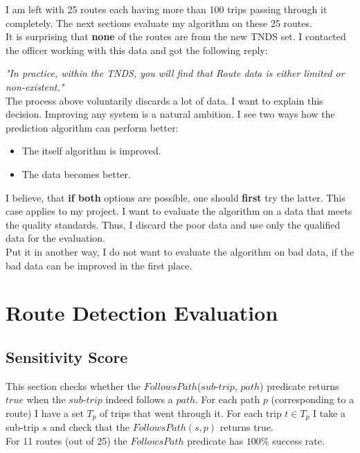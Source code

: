 \documentclass[12pt,a4paper,oneside,openright]{report}
\begin{document}
I am left with 25 routes each having more than 100 trips passing through it completely. The next
sections evaluate my algorithm on these 25 routes. \\

It is surprising that \textbf{none} of the routes are from the new TNDS set. I contacted the officer
working with this data and got the following reply:

\textit{"In practice, within the TNDS, you will find that Route data is either limited or
non-existent."} \\

The process above voluntarily discards a lot of data. I want to explain this decision.
Improving any system is a natural ambition. I see two ways how the prediction algorithm can
perform better:

\begin{itemize} 
\item The itself algorithm is improved.
\item The data becomes better.
\end{itemize}

I believe, that \textbf{if both} options are possible, one should \textbf{first} try the latter.
This case applies to my project. I want to evaluate the algorithm on a data that meets
the quality standards. Thus, I discard the poor data and use only the qualified data for the
evaluation. \\

Put it in another way, I do not want to evaluate the algorithm on bad data, if the bad data
can be improved in the first place.


\section{Route Detection Evaluation}

\subsection{Sensitivity Score}

This section checks whether the $FollowsPath$($sub$-$trip$, $path$) predicate returns $true$
when the $sub$-$trip$ indeed follows a $path$. For each path $p$ (corresponding to a route) I
have a set $T_p$ of trips that went through it. For each trip $t \in T_p$ I take a
sub-trip $s$ and check that the $FollowsPath(s, p)$ returns true. \\

For 11 routes (out of 25) the $FollowsPath$ predicate has $100\%$ success rate. \\
\end{document}
